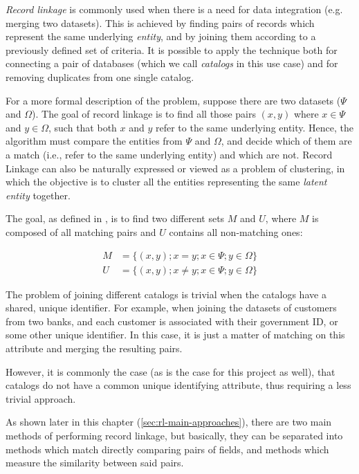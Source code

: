 \documentclass[epsfig,a4paper,11pt,titlepage,twoside,openany]{book}
\begin{document}
\textit{Record linkage} is commonly used when there is a need for data integration (e.g. merging two datasets). This is achieved by finding pairs of records which represent the same underlying \textit{entity}, and by joining them according to a previously defined set of criteria. It is possible to apply the technique both for connecting a pair of databases (which we call \textit{catalogs} in this use case) and for removing duplicates from one single catalog.

  

For a more formal description of the problem, suppose there are two datasets ($\Psi$ and $\Omega$). The goal of record linkage is to find all those pairs $(x, y)$ where $x \in \Psi$ and $y \in \Omega$, such that both $x$ and $y$ refer to the same underlying entity. Hence, the algorithm must compare the entities from $\Psi$ and $\Omega$, and decide which of them are a match (i.e., refer to the same underlying entity) and which are not. 
Record Linkage can also be naturally expressed or viewed as a problem of clustering, in which the objective is to cluster all the entities representing the same \textit{latent entity} together.

The goal, as defined in \cite{fellegi69_theor_recor_linkag}, is to find two different sets $M$ and $U$, where $M$ is composed of all matching pairs and $U$ contains all non-matching ones:

\begin{align*}
  M &= \{(x, y); x = y; x \in \Psi; y \in \Omega\} \\
  U &= \{(x, y); x \neq y; x \in \Psi; y \in \Omega\}
\end{align*}

The problem of joining different catalogs is trivial when the catalogs have a
shared, unique identifier. For example, when joining the datasets of
customers from two banks, and each customer is associated with their government
ID, or some other unique identifier. In this case, it is just a matter of
matching on this attribute and merging the resulting pairs.

However, it is commonly the case (as is the case for this project as well), that
catalogs do not have a common unique identifying attribute, thus requiring a less trivial approach.

As shown later in this chapter (\autoref{sec:rl-main-approaches}), there are two main methods of performing record linkage, but basically, they can be separated into methods which match directly comparing pairs of fields, and methods which measure the similarity between said pairs.
\end{document}
